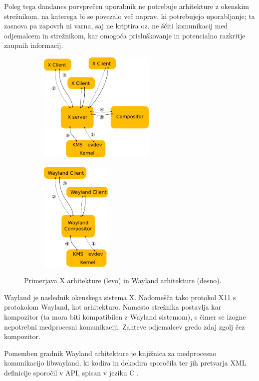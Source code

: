 \documentclass{article}
\begin{document}
Poleg tega dandanes porvprečen uporabnik ne potrebuje arhitekture z okenskim strežnikom, na katerega bi se povezalo več naprav, ki potrebujejo uporabljanje; ta zasnova pa zapovrh ni varna, saj ne kriptira oz. ne ščiti komunikacij med odjemalcem in strežnikom, kar omogoča prisluškovanje in potencialno razkritje zaupnih informacij.

\begin{figure}[H]
    \centering
    \begin{subfigure}{.49\textwidth}
        \centering
        \includegraphics[height=150pt]{x-architecture}
    \end{subfigure}
    \begin{subfigure}{.49\textwidth}
        \centering
        \includegraphics[height=150pt]{wayland-architecture}
    \end{subfigure}
    \caption{Primerjava X arhitekture (levo) in Wayland arhitekture (desno). \autocite{fig:waylandcomparison}}
\end{figure}

Wayland je naslednik okenskega sistema X. Nadomešča tako protokol X11 s protokolom Wayland, kot arhitekturo. Namesto strežnika postavlja kar kompozitor (ta mora biti kompatibilen z Wayland sistemom), s čimer se izogne nepotrebni medprocesni komunikaciji. Zahteve odjemalcev gredo zdaj zgolj čez kompozitor.

Pomemben gradnik Wayland arhitekture je knjižnica za medprocesno komunikacijo libwayland, ki kodira in dekodira sporočila ter jih pretvarja XML definicije sporočil v API, spisan v jeziku C \autocite{wayland}.
\end{document}
